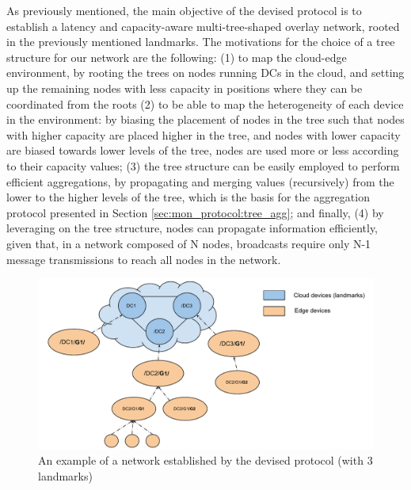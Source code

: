 As previously mentioned, the main objective of the devised protocol is to establish a latency and capacity-aware multi-tree-shaped overlay network, rooted in the previously mentioned landmarks. The motivations for the choice of a tree structure for our network are the following: (1) to map the cloud-edge environment, by rooting the trees on nodes running DCs in the cloud, and setting up the remaining nodes with less capacity in positions where they can be coordinated from the roots (2) to be able to map the heterogeneity of each device in the environment: by biasing the placement of nodes in the tree such that nodes with higher capacity are placed higher in the tree, and nodes with lower capacity are biased towards lower levels of the tree, nodes are used more or less according to their capacity values; (3) the tree structure can be easily employed to perform efficient aggregations, by propagating and merging values (recursively) from the lower to the higher levels of the tree, which is the basis for the aggregation protocol presented in Section \ref{sec:mon_protocol:tree_agg}; and finally, (4) by leveraging on the tree structure, nodes can propagate information efficiently, given that, in a network composed of N nodes, broadcasts require only N-1 message transmissions to reach all nodes in the network. 

\begin{figure}[htbp]
    \centering
    \includegraphics[width=\textwidth]{Chapters/membership/images/DeMMon-overlay-structure.pdf}
    \caption{An example of a network established by the devised protocol (with 3 landmarks)}
    \label{fig:demmon-membership-structure}
\end{figure}

